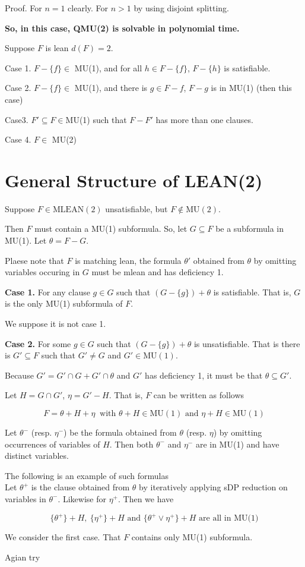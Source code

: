 \documentclass[12pt]{article}
\begin{document}
\begin{CJK*}{GBK}{song}
Proof. For $n=1$ clearly. For $n>1$ by using disjoint splitting. 


{\bf So, in this case, QMU(2) is solvable in polynomial time.}


Suppose $F$ is lean $d(F)=2$. 

Case 1. $F-\{f\}\in$ MU(1), and for all $h\in F-\{f\}$, $F-\{h\}$ is satisfiable.

Case 2. $F-\{f\}\in$ MU(1), and there is $g\in F-f$, $F-g$ is in MU(1) (then this case)

Case3. $F'\subseteq F\in $MU(1) such that $F-F'$ has more than one clauses. 

Case 4. $F\in$ MU(2)



\section{General Structure of LEAN(2)}

Suppose $F\in\text{MLEAN}(2)$ unsatisfiable, but $F\not\in \text{MU}(2)$. 

Then $F$ must contain a MU(1) subformula. So, let $G\subseteq F$ be a subformula in MU(1). Let $\theta=F-G$. 

Plaese note that $F$ is matching lean, the formula $\theta'$ obtained from $\theta$ by omitting variables occuring in $G$ must be mlean and has deficiency 1.  

{\bf Case 1.} For any clause $g\in G$  such that $(G-\{g\})+\theta$ is satisfiable. That is, $G$ is the only MU(1) subformula of $F$. 

We suppose it is not case 1. 

   
{\bf Case 2.} For some $g\in G$ such that $(G-\{g\})+\theta$ is unsatisfiable.
That is there is $G'\subseteq F$ such that $G'\not=G$ and $G'\in \text{MU}(1)$. 

Because $G'=G'\cap G+G'\cap \theta$ and $G'$ has deficiency 1, it must be that $\theta\subseteq G'$. 

Let $H=G\cap G'$, $\eta =G'-H$. That is, $F$ can be written as follows

$$F=\theta+H+\eta\ \text{ with }\theta+H\in \text{MU}(1) \text{ and } \eta+H \in \text{MU}(1)$$ 

Let $\theta^-$ (resp. $\eta^-$) be the formula obtained from $\theta$ (resp. $\eta$) by omitting occurrences of variables of $H$. Then both $\theta^-$ and $\eta^-$ are in MU(1) and have distinct variables. 

The following is an example of such formulas \\


Let $\theta^+$ is the clause obtained from $\theta$ by iteratively applying sDP reduction on variables in $\theta^-$. Likewise for $\eta^+$. Then we have 

$$\{\theta^+\}+H,\ \{\eta^+\}+H \text{ and } \{\theta^+\vee \eta^+\}+H \text{ are all in MU(1)}$$ 


We consider the first case. That $F$ contains only MU(1) subformula.

Agian try 

\end{CJK*}
\end{document}
